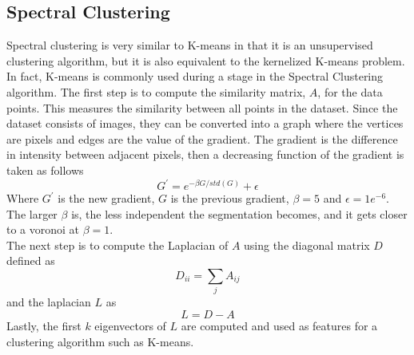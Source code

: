 \documentclass[12pt]{extarticle}
\begin{document}
  \subsection{Spectral Clustering}
    Spectral clustering is very similar to K-means in that it is an
    unsupervised clustering algorithm, but it is also equivalent to the
    kernelized K-means problem. In fact, K-means is commonly used during
    a stage in the Spectral Clustering algorithm. The first step is to
    compute the similarity matrix, $A$, for the data points. This measures the
    similarity between all points in the dataset. Since the dataset consists
    of images, they can be converted into a graph where the vertices are
    pixels and edges are the value of the gradient. The gradient is the
    difference in intensity between adjacent pixels, then a decreasing function
    of the gradient is taken as follows
    \begin{equation}
      G^{\prime} = e^{-\beta G/std(G)} + \epsilon
    \end{equation}
    Where $G^{\prime}$ is the new gradient, $G$ is the previous
    gradient, $\beta = 5$ and $\epsilon = 1e^{-6}$. The larger $\beta$
    is, the less independent the segmentation becomes, and it gets
    closer to a voronoi at $\beta = 1$.
    \\
    The next step is to compute the Laplacian of $A$ using the diagonal matrix
    $D$ defined as 
    \begin{equation}
      D_{ii} = \sum_{j} A_{ij}
    \end{equation}
    and the laplacian $L$ as
    \begin{equation}
      L = D - A
    \end{equation}
    Lastly, the first $k$ eigenvectors of $L$ are computed and used as features
    for a clustering algorithm such as K-means.
\end{document}
